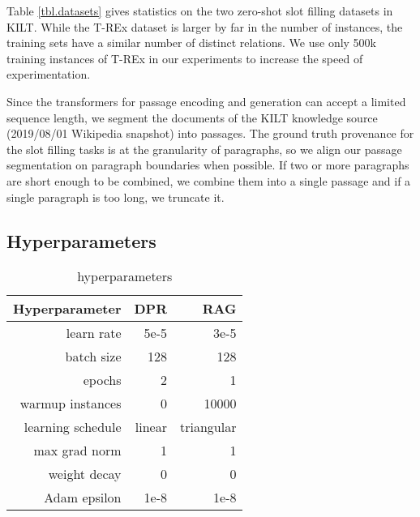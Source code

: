 Table \ref{tbl.datasets} gives statistics on the two zero-shot slot filling datasets in KILT. While the T-REx dataset is larger by far in the number of instances, the training sets have a similar number of distinct relations. We use only 500k training instances of T-REx in our experiments to increase the speed of experimentation.

\begin{table}
\begin{center}
\begingroup
\renewcommand{\arraystretch}{1.2} 
\endgroup
\end{center}
\caption{\label{tbl.datasets}Slot filling datasets in KILT}
\end{table}

Since the transformers for passage encoding and generation can accept a limited sequence length, we segment the documents of the KILT knowledge source (2019/08/01 Wikipedia snapshot) into passages. The ground truth provenance for the slot filling tasks is at the granularity of paragraphs, so we align our passage segmentation on paragraph boundaries when possible.  If two or more paragraphs are short enough to be combined, we combine them into a single passage and if a single paragraph is too long, we truncate it.

\subsection{\kgi{} Hyperparameters}
\begin{table}[t]
\small
\begin{center}
\begin{tabular}{rrr}
\textbf{Hyperparameter} & \textbf{DPR}  & \textbf{RAG} \\
\hline
learn rate  & 5e-5 & 3e-5 \\
batch size & 128 & 128 \\
epochs & 2 & 1\\
warmup instances & 0 & 10000 \\
learning schedule & linear & triangular \\
max grad norm & 1 & 1 \\
weight decay & 0 & 0 \\
Adam epsilon & 1e-8 & 1e-8
\end{tabular}
\end{center}
\caption{\kgi{} hyperparameters}
\label{tbl.hypers}
\end{table}

